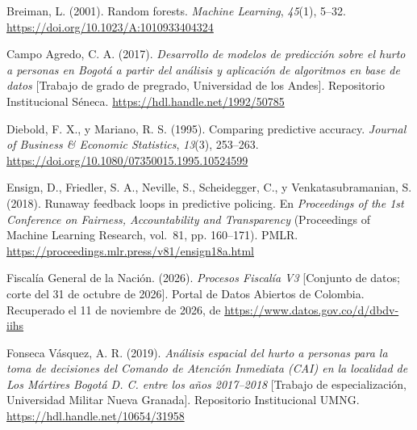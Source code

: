 \begin{thebibliography}{}

Breiman, L. (2001). Random forests. \emph{Machine Learning}, \emph{45}(1), 5--32. \url{https://doi.org/10.1023/A:1010933404324}

Campo Agredo, C. A. (2017). \emph{Desarrollo de modelos de predicción sobre el hurto a personas en Bogotá a partir del análisis y aplicación de algoritmos en base de datos} [Trabajo de grado de pregrado, Universidad de los Andes]. Repositorio Institucional Séneca. \url{https://hdl.handle.net/1992/50785}

Diebold, F. X., y Mariano, R. S. (1995). Comparing predictive accuracy. \emph{Journal of Business \& Economic Statistics}, \emph{13}(3), 253--263. \url{https://doi.org/10.1080/07350015.1995.10524599}

Ensign, D., Friedler, S. A., Neville, S., Scheidegger, C., y Venkatasubramanian, S. (2018). Runaway feedback loops in predictive policing. En \emph{Proceedings of the 1st Conference on Fairness, Accountability and Transparency} (Proceedings of Machine Learning Research, vol.~81, pp. 160--171). PMLR. \url{https://proceedings.mlr.press/v81/ensign18a.html}

Fiscalía General de la Nación. (2026). \emph{Procesos Fiscalía V3} [Conjunto de datos; corte del 31 de octubre de 2026]. Portal de Datos Abiertos de Colombia. Recuperado el 11 de noviembre de 2026, de \url{https://www.datos.gov.co/d/dbdv-iihs}

Fonseca Vásquez, A. R. (2019). \emph{Análisis espacial del hurto a personas para la toma de decisiones del Comando de Atención Inmediata (CAI) en la localidad de Los Mártires Bogotá D. C. entre los años 2017--2018} [Trabajo de especialización, Universidad Militar Nueva Granada]. Repositorio Institucional UMNG. \url{https://hdl.handle.net/10654/31958}


\end{thebibliography}
